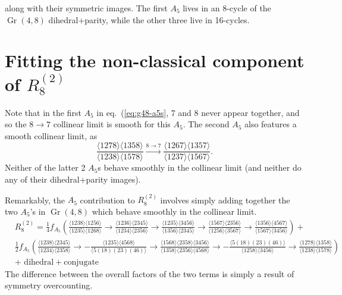 \documentclass[11pt]{article}
\DeclareMathOperator{\Gr}{Gr}
\def\pdfeq#1{\texorpdfstring{$#1$}{a}}
\begin{document}
along with their symmetric images. The first $A_5$ lives in an 8-cycle of the $\Gr(4,8)$ dihedral+parity, while the other three live in 16-cycles. 

\section{Fitting the non-classical component of \pdfeq{R_8^{(2)}}}
Note that in the first $A_5$ in eq.~(\ref{eq:g48-a5s}, 7 and 8 never appear together, and so the $8\to7$ collinear limit is smooth for this $A_5$. The second $A_5$ also features a smooth collinear limit, as 
\begin{equation}
	\frac{\langle 1278\rangle  \langle 1358\rangle
   }{\langle 1238\rangle  \langle 1578\rangle } \xrightarrow{8\to7} \frac{\langle 1267\rangle  \langle 1357\rangle
   }{\langle 1237\rangle  \langle 1567\rangle }.
\end{equation}
Neither of the latter 2 $A_5$s behave smoothly in the collinear limit (and neither do any of their dihedral+parity images).

Remarkably, the $A_5$ contribution to $R^{(2)}_8$ involves simply adding together the two $A_5$'s in $\Gr(4,8)$ which behave smoothly in the collinear limit. 
\begin{equation}\label{eq:r28A5}
\begin{split}
	&R^{(2)}_8 = \frac14 f_{A_5}\left(\frac{\langle 1238\rangle  \langle 1256\rangle }{\langle
   1235\rangle  \langle 1268\rangle }\to \frac{\langle
   1236\rangle  \langle 2345\rangle }{\langle 1234\rangle
    \langle 2356\rangle }\to \frac{\langle 1235\rangle 
   \langle 3456\rangle }{\langle 1356\rangle  \langle
   2345\rangle }\to \frac{\langle 1567\rangle  \langle
   2356\rangle }{\langle 1256\rangle  \langle 3567\rangle
   }\to \frac{\langle 1356\rangle  \langle 4567\rangle
   }{\langle 1567\rangle  \langle 3456\rangle }\right)+\\
   &\frac12 f_{A_5}\left(\frac{\langle 1238\rangle  \langle 2345\rangle
   }{\langle 1234\rangle  \langle 2358\rangle
   }\to-\frac{\langle 1235\rangle  \langle 4568\rangle
   }{\langle 5(18)(23)(46)\rangle }\to\frac{\langle
   1568\rangle  \langle 2358\rangle  \langle 3456\rangle
   }{\langle 1358\rangle  \langle 2356\rangle  \langle
   4568\rangle }\to-\frac{\langle 5(18)(23)(46)\rangle
   }{\langle 1258\rangle  \langle 3456\rangle
   }\to\frac{\langle 1278\rangle  \langle 1358\rangle
   }{\langle 1238\rangle  \langle 1578\rangle }\right)\\
   &+\text{ dihedral} + \text{conjugate}
\end{split}
\end{equation}
The difference between the overall factors of the two terms is simply a result of symmetry overcounting. 
\end{document}
